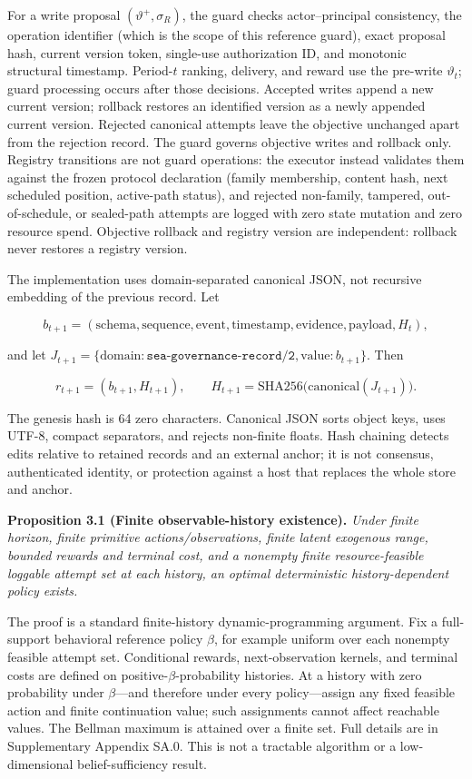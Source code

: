 \documentclass[
  11pt]{article}
\begin{document}
For a write proposal \((\vartheta^+,\sigma_R)\), the guard checks
actor--principal consistency, the operation identifier (which is the
scope of this reference guard), exact proposal hash, current version
token, single-use authorization ID, and monotonic structural timestamp.
Period-\(t\) ranking, delivery, and reward use the pre-write
\(\vartheta_t\); guard processing occurs after those decisions. Accepted
writes append a new current version; rollback restores an identified
version as a newly appended current version. Rejected canonical attempts
leave the objective unchanged apart from the rejection record. The guard
governs objective writes and rollback only. Registry transitions are not
guard operations: the executor instead validates them against the frozen
protocol declaration (family membership, content hash, next scheduled
position, active-path status), and rejected non-family, tampered,
out-of-schedule, or sealed-path attempts are logged with zero state
mutation and zero resource spend. Objective rollback and registry
version are independent: rollback never restores a registry version.

The implementation uses domain-separated canonical JSON, not recursive
embedding of the previous record. Let

\[b_{t+1}=(\mathrm{schema},\mathrm{sequence},\mathrm{event},\mathrm{timestamp},\mathrm{evidence},\mathrm{payload},H_t),\]

and let
\(J_{t+1}=\{\mathrm{domain}:\texttt{sea-governance-record/2},\mathrm{value}:b_{t+1}\}\).
Then

\[r_{t+1}=(b_{t+1},H_{t+1}),\qquad H_{t+1}=\mathrm{SHA256}\bigl(\mathrm{canonical}(J_{t+1})\bigr).\tag{3}\]

The genesis hash is 64 zero characters. Canonical JSON sorts object
keys, uses UTF-8, compact separators, and rejects non-finite floats.
Hash chaining detects edits relative to retained records and an external
anchor; it is not consensus, authenticated identity, or protection
against a host that replaces the whole store and anchor.

\textbf{Proposition 3.1 (Finite observable-history existence).}
\emph{Under finite horizon, finite primitive actions/observations,
finite latent exogenous range, bounded rewards and terminal cost, and a
nonempty finite resource-feasible loggable attempt set at each history,
an optimal deterministic history-dependent policy exists.}

The proof is a standard finite-history dynamic-programming argument. Fix
a full-support behavioral reference policy \(\beta\), for example
uniform over each nonempty feasible attempt set. Conditional rewards,
next-observation kernels, and terminal costs are defined on
positive-\(\beta\)-probability histories. At a history with zero
probability under \(\beta\)---and therefore under every policy---assign
any fixed feasible action and finite continuation value; such
assignments cannot affect reachable values. The Bellman maximum is
attained over a finite set. Full details are in Supplementary Appendix
SA.0. This is not a tractable algorithm or a low-dimensional
belief-sufficiency result.
\end{document}
